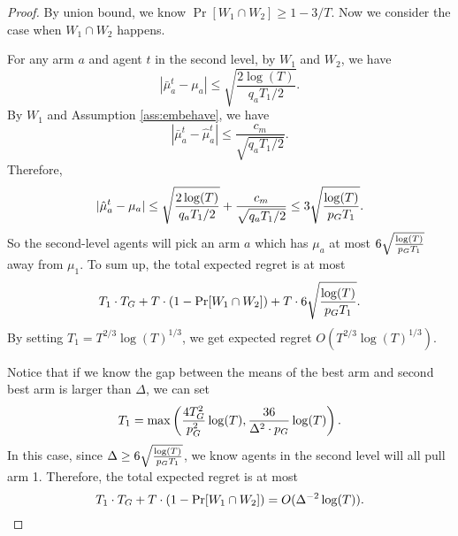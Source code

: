 \begin{proof}
By union bound, we know $\Pr[W_1 \cap W_2] \geq 1 - 3/T$. Now we consider the case when $W_1 \cap W_2$ happens. 

For any arm $a$ and agent $t$ in the second level, by $W_1$ and $W_2$, we have
\[
|\bar{\mu}^t_a - \mu_a| \leq \sqrt{\frac{2\log(T)}{q_aT_1 /2}}.
\]
By $W_1$ and Assumption \ref{ass:embehave}, we have
\[
|\bar{\mu}^t_a - \hat{\mu}^t_a| \leq \frac{c_m}{\sqrt{q_aT_1/2}}.
\]
Therefore,
\[
|\hat{\mu}^t_a - \mu_a|\leq \sqrt{\frac{2\log(T)}{q_aT_1 /2}}+\frac{c_m}{\sqrt{q_aT_1/2}} \leq 3 \sqrt{\frac{\log(T)}{p_G T_1 }}.
\]
So the second-level agents will pick an arm $a$ which has $\mu_a$ at most $6 \sqrt{\frac{\log(T)}{p_G T_1 }}$ away from $\mu_1$. To sum up, the total expected regret is at most 
\[
T_1 \cdot T_G + T \cdot (1-\Pr[W_1 \cap W_2]) + T \cdot  6 \sqrt{\frac{\log(T)}{p_G T_1 }}.
\]
By setting $T_1 = T^{2/3}\log(T)^{1/3}$, we get expected regret $O(T^{2/3}\log(T)^{1/3})$.

Notice that if we know the gap between the means of the best arm and second best arm is larger than $\Delta$, we can set 
\[
T_1 = \max\left( \frac{4T_G^2}{p_G^2}\log(T), \frac{36 }{\Delta^2 \cdot p_G} \log(T) \right).
\]
In this case, since $\Delta \geq 6 \sqrt{\frac{\log(T)}{p_G T_1 }}$, we know agents in the second level will all pull arm 1. Therefore, the total expected regret is at most
\[
T_1 \cdot T_G + T \cdot (1- \Pr[W_1 \cap W_2]) = O(\Delta^{-2} \log(T)).
\]
\end{proof}
